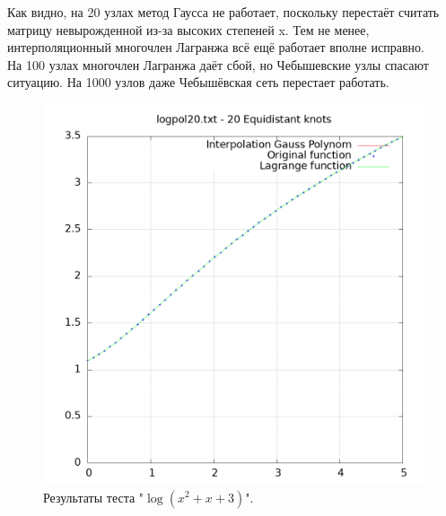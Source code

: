 \documentclass[14pt,a4paper]{extarticle}
\newcommand{\1}{\mathbbm{1}}
\begin{document}
    Как видно, на 20 узлах метод Гаусса не работает, поскольку перестаёт считать матрицу невырожденной из-за высоких степеней x.
    Тем не менее, интерполяционный многочлен Лагранжа всё ещё работает вполне исправно. \\
    На 100 узлах многочлен Лагранжа даёт сбой, но Чебышевские узлы спасают ситуацию. 
    На 1000 узлов даже Чебышёвская сеть перестает работать.

    \begin{figure}
        \centering
        \includegraphics[scale=0.5]{Images/logpol20.txt.png}
        \caption{Результаты теста "$\log(x^2 + x + 3)$".}
    \end{figure}
\end{document}
